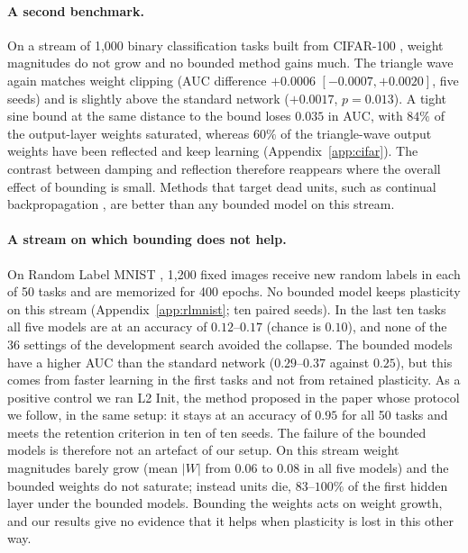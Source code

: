 \documentclass[11pt,a4paper]{article}
\begin{document}
\paragraph{A second benchmark.} On a stream of 1{,}000 binary classification tasks built from CIFAR-100
\citep{krizhevsky2009learning}, weight magnitudes do not grow and no bounded method gains much. The triangle
wave again matches weight clipping (AUC difference $+0.0006$ $[-0.0007,+0.0020]$, five seeds) and is
slightly above the standard network ($+0.0017$, $p=0.013$). A tight sine bound at the same distance to the
bound loses $0.035$ in AUC, with $84\%$ of the output-layer weights saturated, whereas $60\%$ of the
triangle-wave output weights have been reflected and keep learning (Appendix~\ref{app:cifar}). The contrast
between damping and reflection therefore reappears where the overall effect of bounding is small. Methods
that target dead units, such as continual backpropagation \citep{dohare2024loss}, are better than any bounded
model on this stream.

\paragraph{A stream on which bounding does not help.} On Random Label MNIST \citep{kumar2023maintaining},
1{,}200 fixed images receive new random labels in each of 50 tasks and are memorized for 400 epochs. No bounded
model keeps plasticity on this stream (Appendix~\ref{app:rlmnist}; ten paired seeds). In the last ten tasks
all five models are at an accuracy of $0.12$--$0.17$ (chance is $0.10$), and none of the 36 settings of the
development search avoided the collapse. The bounded models have a higher AUC than the standard network
($0.29$--$0.37$ against $0.25$), but this comes from faster learning in the first tasks and not from retained
plasticity. As a positive control we ran L2 Init, the method proposed in the paper whose protocol we follow, in the
same setup: it stays at an accuracy of $0.95$ for all 50 tasks and meets the retention criterion in ten of ten
seeds. The failure of the bounded models is therefore not an artefact of our setup. On this stream weight
magnitudes barely grow (mean $|W|$ from $0.06$ to $0.08$ in all five models) and the bounded weights do not
saturate; instead units die, $83$--$100\%$ of the first hidden layer under the bounded models. Bounding the
weights acts on weight growth, and our results give no evidence that it helps when plasticity is lost in this
other way.
\end{document}
